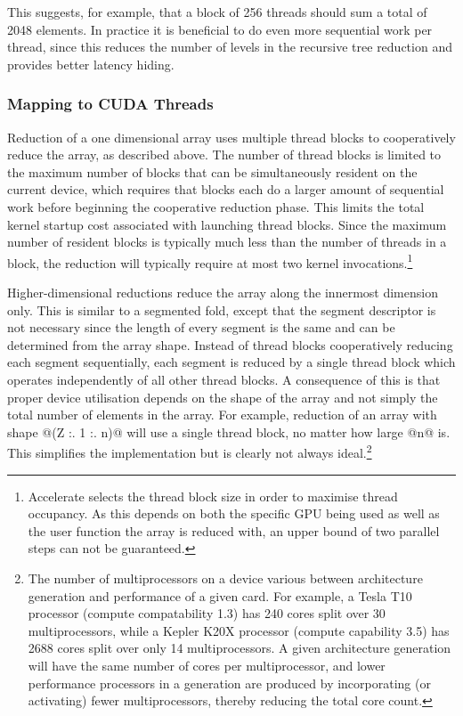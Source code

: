 This suggests, for example, that a block of 256 threads should sum a total of
2048 elements. In practice it is beneficial to do even more sequential work per
thread, since this reduces the number of levels in the recursive tree reduction
and provides better latency hiding.


\subsubsection{Mapping to CUDA Threads}

Reduction of a one dimensional array uses multiple thread blocks to
cooperatively reduce the array, as described above. The number of thread blocks
is limited to the maximum number of blocks that can be simultaneously resident
on the current device, which requires that blocks each do a larger amount of
sequential work before beginning the cooperative reduction phase. This limits
the total kernel startup cost associated with launching thread blocks. Since the
maximum number of resident blocks is typically much less than the number of
threads in a block, the reduction will typically require at most two kernel
invocations.\footnote{Accelerate selects the thread block size in order to
maximise thread occupancy. As this depends on both the specific GPU being used
as well as the user function the array is reduced with, an upper bound of two
parallel steps can not be guaranteed.}

Higher-dimensional reductions reduce the array along the innermost dimension
only. This is similar to a segmented fold, except that the segment descriptor is
not necessary since the length of every segment is the same and can be
determined from the array shape. Instead of thread blocks cooperatively reducing
each segment sequentially, each segment is reduced by a single thread block
which operates independently of all other thread blocks. A consequence of this
is that proper device utilisation depends on the shape of the array and not
simply the total number of elements in the array. For example, reduction of an
array with shape @(Z :. 1 :. n)@ will use a single thread block, no matter
how large @n@ is. This simplifies the implementation but is clearly not
always ideal.\footnote{The number of multiprocessors on a device various between
architecture generation and performance of a given card. For example, a Tesla
T10 processor (compute compatability 1.3) has 240 cores split over 30
multiprocessors, while a Kepler K20X processor (compute capability 3.5) has 2688
cores split over only 14 multiprocessors. A given architecture generation will
have the same number of cores per multiprocessor, and lower performance
processors in a generation are produced by incorporating (or activating) fewer
multiprocessors, thereby reducing the total core count.}


